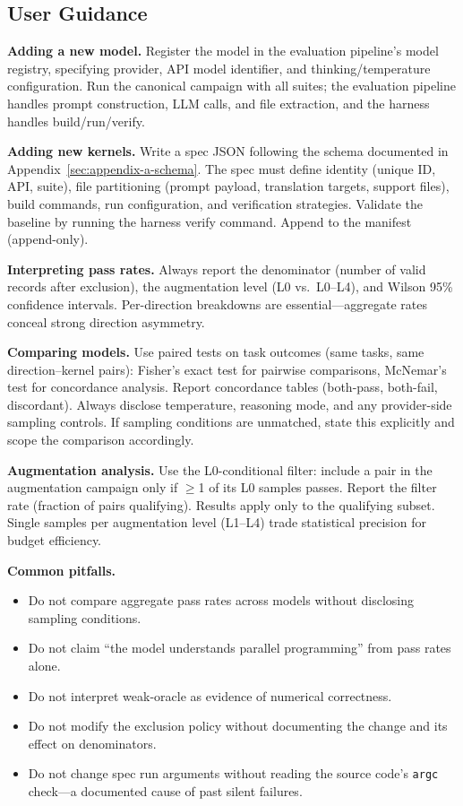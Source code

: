 \subsection{User Guidance}
\label{sec:ec-guidance}

\textbf{Adding a new model.} Register the model in the evaluation pipeline's
model registry, specifying provider, API model identifier, and
thinking/temperature configuration. Run the canonical campaign with all suites;
the evaluation pipeline handles prompt construction, LLM calls, and file
extraction, and the harness handles build/run/verify.

\textbf{Adding new kernels.} Write a spec JSON following the schema documented
in Appendix~\ref{sec:appendix-a-schema}. The spec must define identity
(unique ID, API, suite), file partitioning (prompt payload, translation targets,
support files), build commands, run configuration, and verification strategies.
Validate the baseline by running the harness verify command. Append to the
manifest (append-only).

\textbf{Interpreting pass rates.} Always report the denominator (number of
valid records after \knownfail{} exclusion), the augmentation level (L0 vs.\
L0--L4), and Wilson 95\% confidence intervals. Per-direction breakdowns are
essential---aggregate rates conceal strong direction asymmetry.

\textbf{Comparing models.} Use paired tests on task outcomes (same tasks, same direction--kernel pairs): Fisher's exact test for pairwise comparisons, McNemar's test for concordance analysis. Report concordance tables (both-pass, both-fail, discordant). Always disclose temperature, reasoning mode, and any provider-side sampling controls. If sampling conditions are unmatched, state this explicitly and scope the comparison accordingly.

\textbf{Augmentation analysis.} Use the L0-conditional filter: include a pair in the augmentation campaign only if $\geq$1 of its L0 samples passes. Report the filter rate (fraction of pairs qualifying). Results apply only to the qualifying subset. Single samples per augmentation level (L1--L4) trade statistical precision for budget efficiency.

\textbf{Common pitfalls.}
\begin{itemize}
  \item Do not compare aggregate pass rates across models without disclosing
    sampling conditions.
  \item Do not claim ``the model understands parallel programming'' from pass
    rates alone.
  \item Do not interpret weak-oracle \pass{} as evidence of numerical
    correctness.
  \item Do not modify the \knownfail{} exclusion policy without documenting
    the change and its effect on denominators.
  \item Do not change spec run arguments without reading the source code's
    \texttt{argc} check---a documented cause of past silent failures.
\end{itemize}

